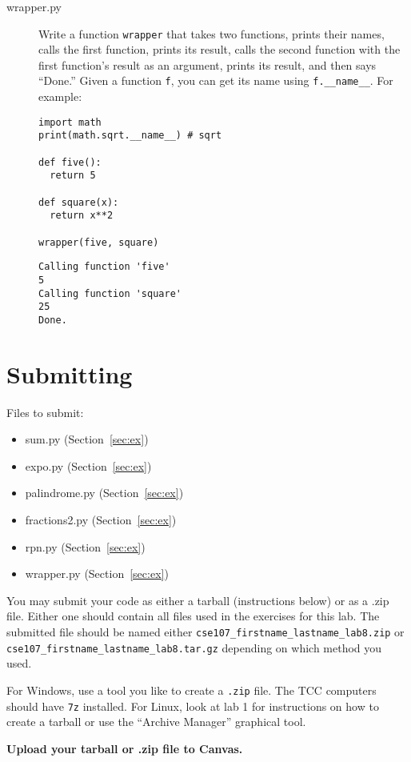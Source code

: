 \documentclass[11pt]{cselabheader}
\begin{document}
\begin{description}
  \item[wrapper.py] Write a function \lstinline!wrapper! that takes two
    functions, prints their names, calls the first function, prints its result,
    calls the second function with the first function's result as an argument,
    prints its result, and then says ``Done.'' Given a function \lstinline!f!,
    you can get its name using \lstinline!f.__name__!. For example:

    \begin{lstlisting}
import math
print(math.sqrt.__name__) # sqrt

def five():
  return 5

def square(x):
  return x**2

wrapper(five, square)
    \end{lstlisting}
    \begin{lstlisting}[style=bash]
Calling function 'five'
5
Calling function 'square'
25
Done.
    \end{lstlisting}
\end{description}

\pagebreak
\section{Submitting}

Files to submit:
\begin{itemize}
  \item sum.py (Section~\ref{sec:ex})
  \item expo.py (Section~\ref{sec:ex})
  \item palindrome.py (Section~\ref{sec:ex})
  \item fractions2.py (Section~\ref{sec:ex})
  \item rpn.py (Section~\ref{sec:ex})
  \item wrapper.py (Section~\ref{sec:ex})
\end{itemize}

You may submit your code as either a tarball (instructions below) or as a .zip
file. Either one should contain all files used in the exercises for this lab.
The submitted file should be named either
\texttt{cse107\_firstname\_lastname\_lab8.zip} or
\texttt{cse107\_firstname\_lastname\_lab8.tar.gz} depending on which method you
used.

For Windows, use a tool you like to create a \texttt{.zip} file. The TCC
computers should have \texttt{7z} installed. For Linux, look at lab 1 for
instructions on how to create a tarball or use the ``Archive Manager'' graphical
tool.

\begin{center}
  \textbf{Upload your tarball or .zip file to Canvas.}
\end{center}
\end{document}
